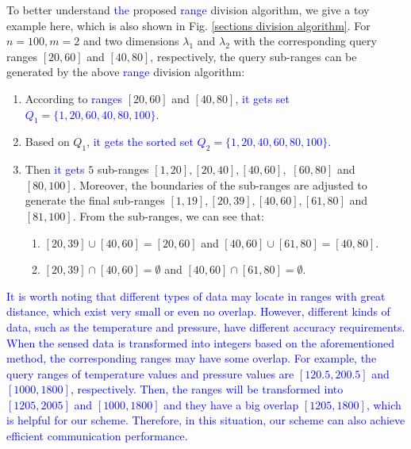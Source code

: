 \documentclass[IEEE JOURNAL OF BIOMEDICAL AND HEALTH INFORMATICS]{IEEEtran}
\begin{document}
{To better understand \textcolor{blue}{the} proposed \textcolor{blue}{range} division algorithm, we give a toy example here, which is also shown in Fig. \ref{sections division algorithm}. For $n = 100, m = 2$ and two dimensions $\lambda_1$ and $\lambda_2$ with the corresponding query ranges $[20, 60]$ and $[40, 80]$, respectively, the query sub-ranges can be generated by the above \textcolor{blue}{range} division algorithm:
\begin{enumerate}
	\item According to \textcolor{blue}{ranges} $[20, 60]$ and $[40, 80]$, \textcolor{blue}{it gets set $Q_1=\{1, 20, 60, 40, 80, 100\}$.}
	\item Based on $Q_1$, \textcolor{blue}{it gets the sorted set $Q_2=\{1, 20, 40, 60, 80, 100\}$.}
	\item Then \textcolor{blue}{it gets} $5$ sub-ranges $[1, 20], [20, 40], [40, 60],$ $[60, 80]$ and $[80, 100]$. Moreover, the boundaries of the sub-ranges are adjusted to generate the final sub-ranges $[1, 19], [20, 39], [40, 60], [61, 80]$ and $[81, 100]$.	
From the sub-ranges, we can see that:
	\begin{enumerate}
		\item $[20,39] \cup [40, 60] = [20, 60]$ and $[40, 60] \cup [61, 80]=[40, 80]$.
		\item $[20,39] \cap [40, 60] = \emptyset$ and $[40, 60] \cap [61, 80]= \emptyset$.
	\end{enumerate}
\end{enumerate}

\textcolor{blue}{It is worth noting that different types of data may locate in ranges with great distance, which exist very small or even no overlap. However, different kinds of data, such as the temperature and pressure, have different accuracy requirements. When the sensed data is transformed into integers based on the aforementioned method, the \textcolor{blue}{corresponding} ranges may have some overlap. For example, the query ranges of temperature values and pressure values are $[120.5, 200.5]$ and $[1000, 1800]$, respectively. Then, the ranges will be transformed into $[1205, 2005]$ and $[1000, 1800]$ and they have a big overlap $[1205, 1800]$, which is helpful for our scheme. Therefore, in this situation, our scheme can also achieve efficient communication performance.} 




}
\end{document}
